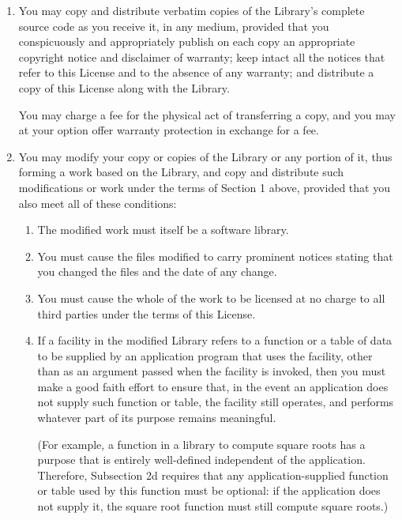 {\begin{multicols}{2}
\begin{enumerate}
\item
You may copy and distribute verbatim copies of the Library's complete source 
code as you receive it, in any medium, provided that you conspicuously and 
appropriately publish on each copy an appropriate copyright notice and 
disclaimer of warranty; keep intact all the notices that refer to this License 
and to the absence of any warranty; and distribute a copy of this License along 
with the Library.

You may charge a fee for the physical act of transferring a copy, and you may at 
your option offer warranty protection in exchange for a fee. 

\item
You may modify your copy or copies of the Library or any portion of it, thus 
forming a work based on the Library, and copy and distribute such modifications 
or work under the terms of Section 1 above, provided that you also meet all of 
these conditions:

\begin{enumerate}

\item
The modified work must itself be a software library.

\item
You must cause the files modified to carry prominent notices stating that you 
changed the files and the date of any change.

\item
You must cause the whole of the work to be licensed at no charge to all third 
parties under the terms of this License.

\item
If a facility in the modified Library refers to a function or a table of data to 
be supplied by an application program that uses the facility, other than as an 
argument passed when the facility is invoked, then you must make a good faith 
effort to ensure that, in the event an application does not supply such function 
or table, the facility still operates, and performs whatever part of its purpose 
remains meaningful.

(For example, a function in a library to compute square roots has a purpose that 
is entirely well-defined independent of the application. Therefore, Subsection 
2d requires that any application-supplied function or table used by this 
function must be optional: if the application does not supply it, the square 
root function must still compute square roots.)

\end{enumerate}


\end{enumerate}
\end{multicols}}
